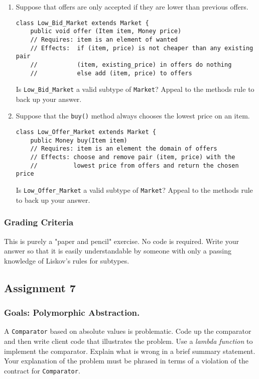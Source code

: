 \documentclass[11pt]{article}
\begin{document}
\begin{enumerate}
\item Suppose that offers are only accepted if they are lower than previous offers.
\begin{verbatim}
class Low_Bid_Market extends Market {
    public void offer (Item item, Money price)
    // Requires: item is an element of wanted
    // Effects:  if (item, price) is not cheaper than any existing pair
    //           (item, existing_price) in offers do nothing
    //           else add (item, price) to offers

\end{verbatim}
Is \texttt{Low\_Bid\_Market} a valid subtype of \texttt{Market}? Appeal to the methods rule to back up your answer.

\item Suppose that the \texttt{buy()} method always chooses the lowest price on an item.
\begin{verbatim}
class Low_Offer_Market extends Market {
    public Money buy(Item item)
    // Requires: item is an element the domain of offers
    // Effects: choose and remove pair (item, price) with the 
    //          lowest price from offers and return the chosen price
\end{verbatim}
Is \texttt{Low\_Offer\_Market} a valid subtype of \texttt{Market}? Appeal to the methods rule to back up your answer.
\end{enumerate}


\subsubsection{Grading Criteria}
\label{sec:org373bcc0}

This is purely a "paper and pencil" exercise. No code is required. Write your answer so that it is easily understandable by someone with only a passing knowledge of Liskov's rules for subtypes.


\subsection{Assignment 7}
\label{sec:org5d1a5c5}
\subsubsection{Goals: Polymorphic Abstraction.}
\label{sec:org211a1c5}

A \texttt{Comparator} based on absolute values is problematic. Code up the comparator and then write client code that illustrates the problem. Use a \emph{lambda function} to implement the comparator. Explain what is wrong in a brief summary statement. Your explanation of the problem must be phrased in terms of a violation of the contract for \texttt{Comparator}.
\end{document}
